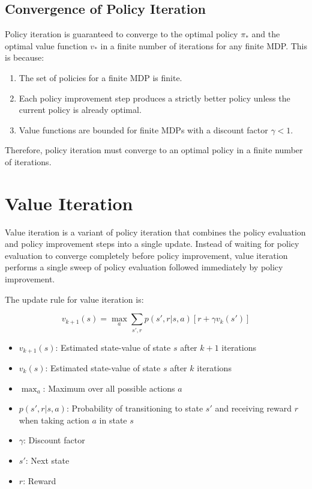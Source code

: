 \documentclass{article}
\begin{document}
\subsection{Convergence of Policy Iteration}

Policy iteration is guaranteed to converge to the optimal policy $\pi_*$ and the optimal value function $v_*$ in a finite number of iterations for any finite MDP. This is because:

\begin{enumerate}
    \item The set of policies for a finite MDP is finite.
    \item Each policy improvement step produces a strictly better policy unless the current policy is already optimal.
    \item Value functions are bounded for finite MDPs with a discount factor $\gamma < 1$.
\end{enumerate}

Therefore, policy iteration must converge to an optimal policy in a finite number of iterations.

\section{Value Iteration}

Value iteration is a variant of policy iteration that combines the policy evaluation and policy improvement steps into a single update. Instead of waiting for policy evaluation to converge completely before policy improvement, value iteration performs a single sweep of policy evaluation followed immediately by policy improvement.

The update rule for value iteration is:

\begin{equation}
v_{k+1}(s) = \max_a \sum_{s',r} p(s',r|s,a)[r + \gamma v_k(s')]
\end{equation}

\begin{tcolorbox}[colframe=blue!50!black, colback=blue!10, title=Notation Overview]
\begin{itemize}
    \item $v_{k+1}(s)$: Estimated state-value of state $s$ after $k+1$ iterations
    \item $v_k(s)$: Estimated state-value of state $s$ after $k$ iterations
    \item $\max_a$: Maximum over all possible actions $a$
    \item $p(s',r|s,a)$: Probability of transitioning to state $s'$ and receiving reward $r$ when taking action $a$ in state $s$
    \item $\gamma$: Discount factor
    \item $s'$: Next state
    \item $r$: Reward
\end{itemize}
\end{tcolorbox}
\end{document}
